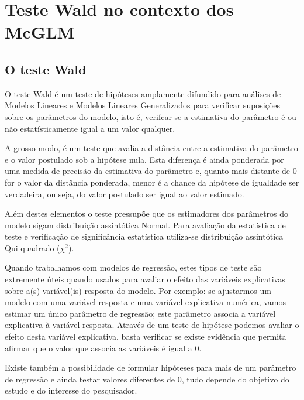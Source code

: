 
\chapter{Teste Wald no contexto dos McGLM}

\label{cap:wald}


\section{O teste Wald}

O teste Wald é um teste de hipóteses amplamente difundido para análises de Modelos Lineares e Modelos Lineares Generalizados para verificar suposições sobre os parâmetros do modelo, isto é, verifcar se a estimativa do parâmetro é ou não estatísticamente igual a um valor qualquer.

A grosso modo, é um teste que avalia a distância entre a estimativa do parâmetro e o valor postulado sob a hipótese nula. Esta diferença é ainda ponderada por uma medida de precisão da estimativa do parâmetro e, quanto mais distante de 0 for o valor da distância ponderada, menor é a chance da hipótese de igualdade ser verdadeira, ou seja, do valor postulado ser igual ao valor estimado.

Além destes elementos o teste pressupõe que os estimadores dos parâmetros do modelo sigam distribuição assintótica Normal. Para avaliação da estatística de teste e verificação de significância estatística utiliza-se distribuição assintótica Qui-quadrado ($\chi^2$).

Quando trabalhamos com modelos de regressão, estes tipos de teste são extremente úteis quando usados para avaliar o efeito das variáveis explicativas sobre a(s) variável(is) resposta do modelo. Por exemplo: se ajustarmos um modelo com uma variável resposta e uma variável explicativa numérica, vamos estimar um único parâmetro de regressão; este parâmetro associa a variável explicativa à variável resposta. Através de um teste de hipótese podemos avaliar o efeito desta variável explicativa, basta verificar se existe evidência que permita afirmar que o valor que associa as variáveis é igual a 0. 

Existe também a possibilidade de formular hipóteses para mais de um parâmetro de regressão e ainda testar valores diferentes de 0, tudo depende do objetivo do estudo e do interesse do pesquisador. 

